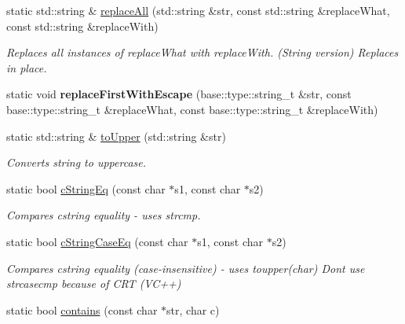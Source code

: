 \begin{DoxyCompactItemize}
static std\+::string \& \hyperlink{classel_1_1base_1_1utils_1_1Str_a8e823aa60b160451ca0b8732c3c75568}{replace\+All} (std\+::string \&str, const std\+::string \&replace\+What, const std\+::string \&replace\+With)
\begin{DoxyCompactList}\small\item\em Replaces all instances of \textquotesingle{}replace\+What\textquotesingle{} with \textquotesingle{}replace\+With\textquotesingle{}. (String version) Replaces in place. \end{DoxyCompactList}\item 
static void {\bfseries replace\+First\+With\+Escape} (base\+::type\+::string\+\_\+t \&str, const base\+::type\+::string\+\_\+t \&replace\+What, const base\+::type\+::string\+\_\+t \&replace\+With)\hypertarget{classel_1_1base_1_1utils_1_1Str_a3725349f601d07316d1c2bc211daaaa1}{}\label{classel_1_1base_1_1utils_1_1Str_a3725349f601d07316d1c2bc211daaaa1}

\item 
static std\+::string \& \hyperlink{classel_1_1base_1_1utils_1_1Str_a6a05315fb967508dc1faf0584421a95d}{to\+Upper} (std\+::string \&str)
\begin{DoxyCompactList}\small\item\em Converts string to uppercase. \end{DoxyCompactList}\item 
static bool \hyperlink{classel_1_1base_1_1utils_1_1Str_a8081458c7848ff991d765c69f7858c44}{c\+String\+Eq} (const char $\ast$s1, const char $\ast$s2)\hypertarget{classel_1_1base_1_1utils_1_1Str_a8081458c7848ff991d765c69f7858c44}{}\label{classel_1_1base_1_1utils_1_1Str_a8081458c7848ff991d765c69f7858c44}

\begin{DoxyCompactList}\small\item\em Compares cstring equality -\/ uses strcmp. \end{DoxyCompactList}\item 
static bool \hyperlink{classel_1_1base_1_1utils_1_1Str_aaa37755d713b5e6475950134ce9ce0e8}{c\+String\+Case\+Eq} (const char $\ast$s1, const char $\ast$s2)\hypertarget{classel_1_1base_1_1utils_1_1Str_aaa37755d713b5e6475950134ce9ce0e8}{}\label{classel_1_1base_1_1utils_1_1Str_aaa37755d713b5e6475950134ce9ce0e8}

\begin{DoxyCompactList}\small\item\em Compares cstring equality (case-\/insensitive) -\/ uses toupper(char) Dont use strcasecmp because of C\+RT (V\+C++) \end{DoxyCompactList}\item 
static bool \hyperlink{classel_1_1base_1_1utils_1_1Str_a27cc1c1625b21597eb75df62b8fca0f8}{contains} (const char $\ast$str, char c)\hypertarget{classel_1_1base_1_1utils_1_1Str_a27cc1c1625b21597eb75df62b8fca0f8}{}\label{classel_1_1base_1_1utils_1_1Str_a27cc1c1625b21597eb75df62b8fca0f8}


\end{DoxyCompactItemize}
